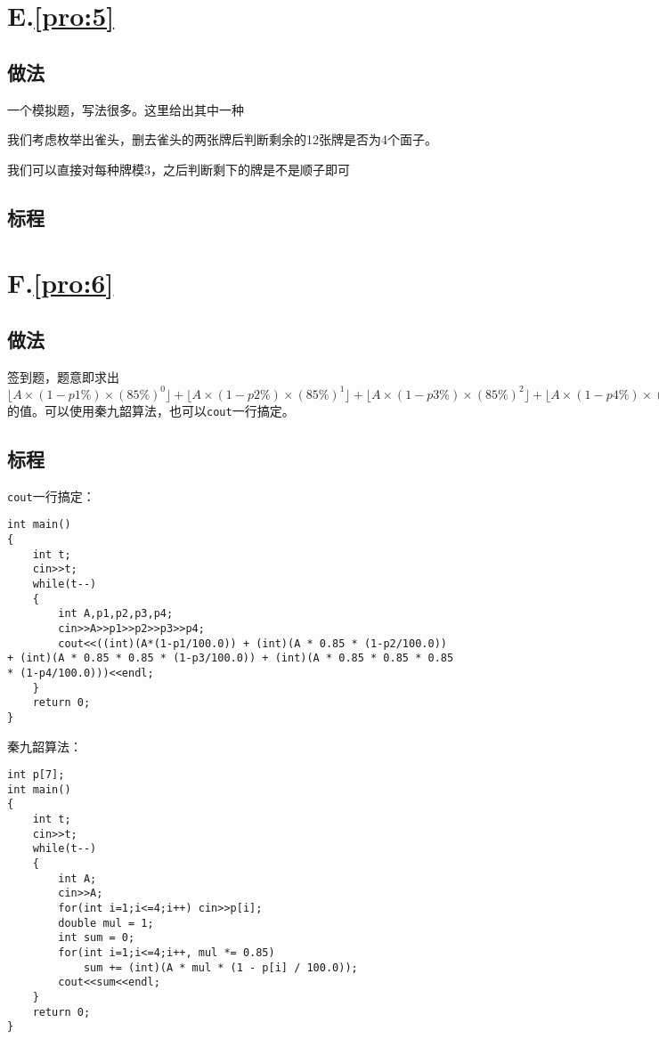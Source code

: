 \documentclass[
	lang=cn,
	color=blue
]{elegantbook}
\begin{document}
\chapter*{E.\quad \ref*{pro:5}}
\section*{做法}

一个模拟题，写法很多。这里给出其中一种

我们考虑枚举出雀头，删去雀头的两张牌后判断剩余的12张牌是否为4个面子。

我们可以直接对每种牌模3，之后判断剩下的牌是不是顺子即可

\section*{标程}

\chapter*{F.\quad \ref*{pro:6}}
\section*{做法}
签到题，题意即求出$\lfloor A \times (1-p1\%) \times (85\%)^0 \rfloor + \lfloor A \times (1-p2\%) \times (85\%)^1 \rfloor + \lfloor A \times (1-p3\%) \times (85\%)^2 \rfloor + \lfloor A \times (1-p4\%) \times (85\%)^3 \rfloor$的值。可以使用秦九韶算法，也可以\lstinline{cout}一行搞定。

\section*{标程}
\lstinline{cout}一行搞定：
\begin{lstlisting}
int main()
{
    int t;
    cin>>t;
    while(t--)
    {
        int A,p1,p2,p3,p4;
        cin>>A>>p1>>p2>>p3>>p4;
        cout<<((int)(A*(1-p1/100.0)) + (int)(A * 0.85 * (1-p2/100.0)) + (int)(A * 0.85 * 0.85 * (1-p3/100.0)) + (int)(A * 0.85 * 0.85 * 0.85 * (1-p4/100.0)))<<endl;
    }
    return 0;
}
\end{lstlisting}

秦九韶算法：
\begin{lstlisting}
int p[7];
int main()
{
    int t;
    cin>>t;
    while(t--)
    {
        int A;
        cin>>A;
        for(int i=1;i<=4;i++) cin>>p[i];
        double mul = 1;
        int sum = 0;
        for(int i=1;i<=4;i++, mul *= 0.85)
            sum += (int)(A * mul * (1 - p[i] / 100.0));
        cout<<sum<<endl;
    }
    return 0;
}
\end{lstlisting}
\end{document}
